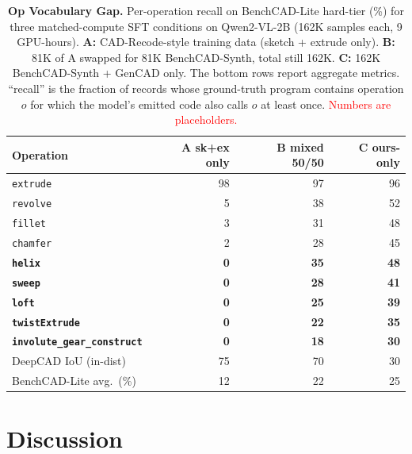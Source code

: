 \documentclass{article}
\begin{document}
\begin{table}[t]
\centering
\small
\setlength{\tabcolsep}{4pt}
\caption{\textbf{Op Vocabulary Gap.} Per-operation recall on BenchCAD-Lite hard-tier (\%) for three matched-compute SFT conditions on Qwen2-VL-2B (162K samples each, 9 GPU-hours). \textbf{A:} CAD-Recode-style training data (sketch + extrude only). \textbf{B:} 81K of A swapped for 81K BenchCAD-Synth, total still 162K. \textbf{C:} 162K BenchCAD-Synth + GenCAD only. The bottom rows report aggregate metrics. ``recall'' is the fraction of records whose ground-truth program contains operation $o$ for which the model's emitted code also calls $o$ at least once. \textcolor{red}{Numbers are placeholders.}}
\label{tab:op_gap}
\begin{tabular}{lrrr}
\toprule
Operation                & \textbf{A} sk+ex only & \textbf{B} mixed 50/50 & \textbf{C} ours-only \\
\midrule
\texttt{extrude}         & 98 & 97 & 96 \\
\texttt{revolve}         & 5  & 38 & 52 \\
\texttt{fillet}          & 3  & 31 & 48 \\
\texttt{chamfer}         & 2  & 28 & 45 \\
\midrule
\textbf{\texttt{helix}}        & \textbf{0} & \textbf{35} & \textbf{48} \\
\textbf{\texttt{sweep}}        & \textbf{0} & \textbf{28} & \textbf{41} \\
\textbf{\texttt{loft}}         & \textbf{0} & \textbf{25} & \textbf{39} \\
\textbf{\texttt{twistExtrude}} & \textbf{0} & \textbf{22} & \textbf{35} \\
\textbf{\texttt{involute\_gear\_construct}} & \textbf{0} & \textbf{18} & \textbf{30} \\
\midrule
DeepCAD IoU (in-dist)    & 75 & 70 & 30 \\
BenchCAD-Lite avg.\ (\%) & 12 & 22 & 25 \\
\bottomrule
\end{tabular}
\end{table}


\section{Discussion}
\label{sec:discussion}
\end{document}
